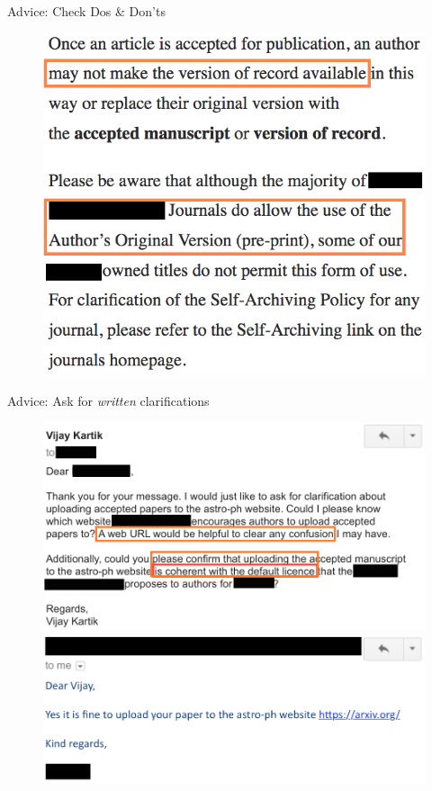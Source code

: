 \documentclass[10pt]{beamer}
\begin{document}
\begin{frame}{Advice: Check Dos \& Don'ts}
	\begin{figure}
		\includegraphics[trim={0pt 30pt 0pt 0pt}, clip, width=\columnwidth]{images/licenceFAQ003}
	\end{figure}
\end{frame}

\begin{frame}{Advice: Ask for \emph{written} clarifications}
	\begin{figure}
		\includegraphics[trim={0pt 0pt 0pt 0pt}, clip, width=0.8\columnwidth]{images/email01}
        
        \includegraphics[trim={0pt 0pt 0pt 0pt}, clip, width=0.8\columnwidth]{images/email02}
	\end{figure}
\end{frame}
\end{document}
